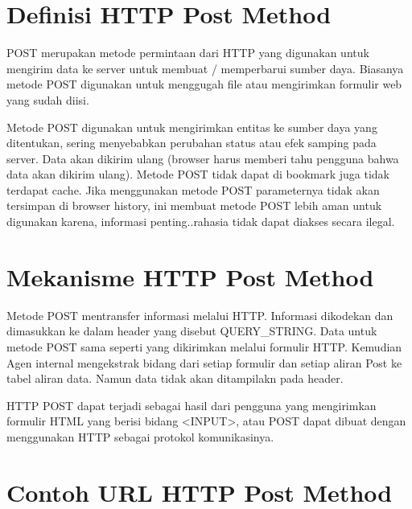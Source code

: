 \section{Definisi HTTP Post Method}
POST merupakan metode permintaan dari HTTP yang digunakan untuk mengirim data ke server untuk membuat / memperbarui sumber daya. Biasanya metode POST digunakan untuk menggugah file atau mengirimkan  formulir web yang sudah diisi. 

Metode POST digunakan untuk mengirimkan entitas ke sumber daya yang ditentukan, sering menyebabkan perubahan status atau efek samping pada server. Data akan dikirim ulang (browser harus memberi tahu pengguna bahwa data akan dikirim ulang). Metode POST tidak dapat di bookmark juga tidak terdapat  cache. Jika menggunakan metode POST parameternya tidak akan tersimpan di browser history, ini membuat metode POST lebih aman untuk digunakan karena, informasi penting..rahasia tidak dapat diakses secara ilegal.

\section{Mekanisme HTTP Post Method}
Metode POST mentransfer informasi melalui HTTP. Informasi dikodekan dan dimasukkan ke dalam header yang disebut QUERY\_STRING. Data untuk metode POST sama seperti yang dikirimkan melalui formulir HTTP. Kemudian Agen internal mengekstrak bidang dari setiap formulir dan setiap aliran Post ke tabel aliran data. Namun data tidak akan ditampilakn pada header.

HTTP POST dapat terjadi sebagai hasil dari pengguna yang mengirimkan formulir HTML yang berisi bidang <INPUT>, atau POST dapat dibuat dengan menggunakan HTTP sebagai protokol komunikasinya.

\section{Contoh  URL HTTP Post Method}


